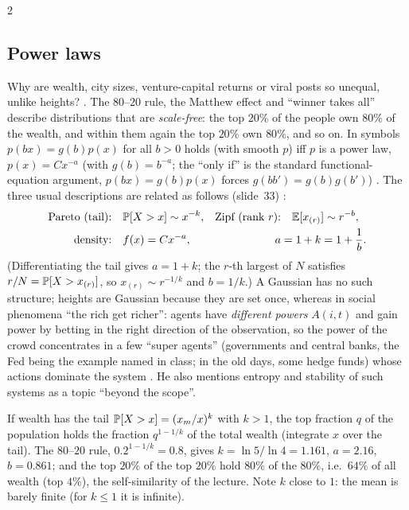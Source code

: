 \begin{paracol}{2}
\subsection{Power laws}
Why are wealth, city sizes, venture-capital returns or viral posts so unequal, unlike heights?
. The $80$--$20$ rule, the Matthew effect and ``winner takes all'' describe distributions
that are \emph{scale-free}: the top $20\%$ of the people own $80\%$ of the wealth, and within them again the top $20\%$
own $80\%$, and so on. In symbols $p(bx)=g(b)p(x)$ for all $b>0$ holds (with smooth $p$) iff $p$ is a power law, $p(x)=Cx^{-a}$
(with $g(b)=b^{-a}$; the ``only if'' is the standard functional-equation argument, $p(bx)=g(b)p(x)$ forces $g(bb')=g(b)g(b')$) .
The three usual descriptions are related as follows (slide~33) :
\begin{align*}
  \text{Pareto (tail):}&\quad \mathbb{P}[X>x]\sim x^{-k}, & \text{Zipf (rank $r$):}&\quad \mathbb{E}[x_{(r)}]\sim r^{-b},\\
  \text{density:}&\quad f(x)=Cx^{-a}, & a&=1+k=1+\frac1b .
\end{align*}
(Differentiating the tail gives $a=1+k$; the $r$-th largest of $N$ satisfies $r/N=\mathbb{P}[X>x_{(r)}]$, so $x_{(r)}\sim r^{-1/k}$ and $b=1/k$.)
A Gaussian has no such structure; heights are Gaussian because they are set once, whereas in social
phenomena ``the rich get richer'': agents have \emph{different powers} $A(i,t)$ and gain power by betting in the
right direction of the observation, so the power of the crowd concentrates in a few ``super agents'' (governments and central banks, the Fed being the example named in class; in the old days, some hedge funds) whose actions dominate the system
. He also mentions entropy and stability of such systems as a topic
``beyond the scope''.

\begin{example}\label{ch10:ex-pareto}
If wealth has the tail $\mathbb{P}[X>x]=(x_m/x)^k$ with $k>1$, the top fraction $q$ of the population holds the fraction
$q^{1-1/k}$ of the total wealth (integrate $x$ over the tail). The $80$--$20$ rule, $0.2^{1-1/k}=0.8$, gives
$k=\ln5/\ln4=1.161$, $a=2.16$, $b=0.861$; and the top $20\%$ of the top $20\%$ hold $80\%$ of the $80\%$, i.e.\ $64\%$ of all
wealth (top $4\%$), the self-similarity of the lecture. Note $k$ close to $1$: the mean is barely finite
(for $k\le1$ it is infinite).
\end{example}


\end{paracol}
